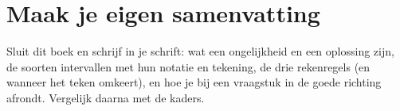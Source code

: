\ifzelfstudie
\section*{Maak je eigen samenvatting}
Sluit dit boek en schrijf in je schrift: wat een ongelijkheid en een oplossing zijn, de soorten intervallen met hun notatie en tekening, de drie rekenregels (en wanneer het teken omkeert), en hoe je bij een vraagstuk in de goede richting afrondt. Vergelijk daarna met de kaders.
\fi
